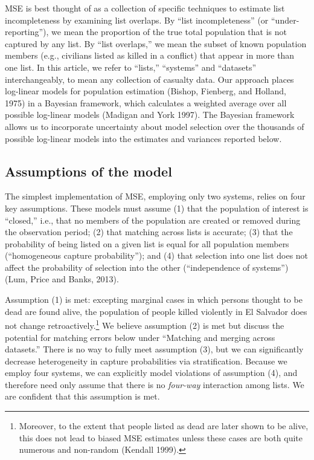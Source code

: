 \documentclass[11pt,]{article}
\let\rmarkdownfootnote\footnote%
\def\footnote{\protect\rmarkdownfootnote}
\begin{document}
MSE is best thought of as a collection of specific techniques to
estimate list incompleteness by examining list overlaps. By ``list
incompleteness'' (or ``under-reporting''), we mean the proportion of the
true total population that is not captured by any list. By ``list
overlaps,'' we mean the subset of known population members (e.g.,
civilians listed as killed in a conflict) that appear in more than one
list. In this article, we refer to ``lists,'' ``systems'' and
``datasets'' interchangeably, to mean any collection of casualty data.
Our approach places log-linear models for population estimation (Bishop,
Fienberg, and Holland, 1975) in a Bayesian framework, which calculates a
weighted average over all possible log-linear models (Madigan and York
1997). The Bayesian framework allows us to incorporate uncertainty about
model selection over the thousands of possible log-linear models into
the estimates and variances reported below.

\hypertarget{assumptions-of-the-model}{%
\subsection{Assumptions of the model}\label{assumptions-of-the-model}}

The simplest implementation of MSE, employing only two systems, relies
on four key assumptions. These models must assume (1) that the
population of interest is ``closed,'' i.e., that no members of the
population are created or removed during the observation period; (2)
that matching across lists is accurate; (3) that the probability of
being listed on a given list is equal for all population members
(``homogeneous capture probability''); and (4) that selection into one
list does not affect the probability of selection into the other
(``independence of systems'') (Lum, Price and Banks, 2013).

Assumption (1) is met: excepting marginal cases in which persons thought
to be dead are found alive, the population of people killed violently in
El Salvador does not change retroactively.\footnote{Moreover, to the
  extent that people listed as dead are later shown to be alive, this
  does not lead to biased MSE estimates unless these cases are both
  quite numerous and non-random (Kendall 1999).} We believe assumption
(2) is met but discuss the potential for matching errors below under
``Matching and merging across datasets.'' There is no way to fully meet
assumption (3), but we can significantly decrease heterogeneity in
capture probabilities via stratification. Because we employ four
systems, we can explicitly model violations of assumption (4), and
therefore need only assume that there is no \emph{four-way} interaction
among lists. We are confident that this assumption is met.
\end{document}
